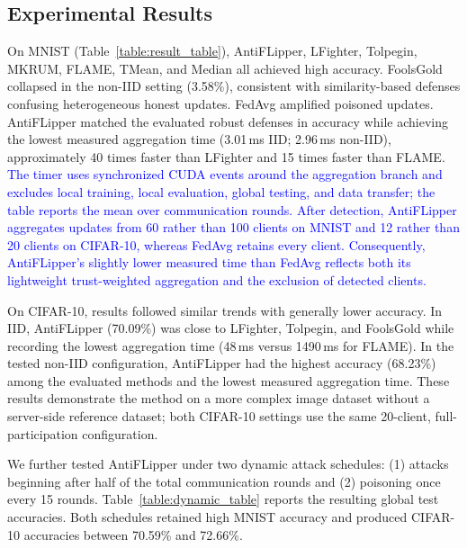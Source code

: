 \documentclass[conference]{IEEEtran}
\begin{document}
\subsection{Experimental Results}

On MNIST (Table~\ref{table:result_table}), AntiFLipper, LFighter, Tolpegin, MKRUM, FLAME, TMean, and Median all achieved high accuracy. FoolsGold collapsed in the non-IID setting (3.58\%), consistent with similarity-based defenses confusing heterogeneous honest updates. FedAvg amplified poisoned updates. AntiFLipper matched the evaluated robust defenses in accuracy while achieving the lowest measured aggregation time (3.01\,ms IID; 2.96\,ms non-IID), approximately 40 times faster than LFighter and 15 times faster than FLAME. \textcolor{blue}{The timer uses synchronized CUDA events around the aggregation branch and excludes local training, local evaluation, global testing, and data transfer; the table reports the mean over communication rounds. After detection, AntiFLipper aggregates updates from 60 rather than 100 clients on MNIST and 12 rather than 20 clients on CIFAR-10, whereas FedAvg retains every client. Consequently, AntiFLipper's slightly lower measured time than FedAvg reflects both its lightweight trust-weighted aggregation and the exclusion of detected clients.}

On CIFAR-10, results followed similar trends with generally lower accuracy. In IID, AntiFLipper (70.09\%) was close to LFighter, Tolpegin, and FoolsGold while recording the lowest aggregation time (48\,ms versus 1490\,ms for FLAME). In the tested non-IID configuration, AntiFLipper had the highest accuracy (68.23\%) among the evaluated methods and the lowest measured aggregation time. These results demonstrate the method on a more complex image dataset without a server-side reference dataset; both CIFAR-10 settings use the same 20-client, full-participation configuration.

We further tested AntiFLipper under two dynamic attack schedules: (1) attacks beginning after half of the total communication rounds and (2) poisoning once every 15 rounds. Table~\ref{table:dynamic_table} reports the resulting global test accuracies. Both schedules retained high MNIST accuracy and produced CIFAR-10 accuracies between 70.59\% and 72.66\%. %
\end{document}
